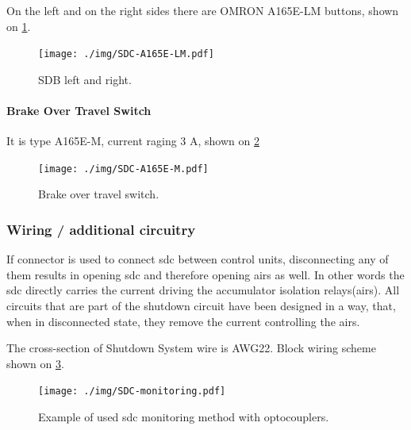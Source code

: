 On the left and on the right sides there are OMRON A165E-LM buttons, shown on \ref{fig:SDC-A165E-LM}.
\begin{figure}[H]
	\centering
	\texttt{[image: ./img/SDC-A165E-LM.pdf]}
	\caption{SDB left and right.}
	\label{fig:SDC-A165E-LM}
\end{figure}

\paragraph{Brake Over Travel Switch}
It is type A165E-M, current raging 3 A, shown on \ref{fig:SDC-A165E-M}
\begin{figure}[H]
	\centering
	\texttt{[image: ./img/SDC-A165E-M.pdf]}
	\caption{Brake over travel switch.}
	\label{fig:SDC-A165E-M}
\end{figure}


\subsubsection{Wiring / additional circuitry}

If connector is used to connect \gls{sdc} between control units, disconnecting any of them results in opening \gls{sdc} and therefore opening \glspl{air} as well. In other words the \gls{sdc} directly carries the current driving the accumulator isolation relays(\glspl{air}). All circuits that are part of the shutdown circuit have been designed in a way, that, when in disconnected state, they remove the current controlling the \glspl{air}.

The cross-section of Shutdown System wire is AWG22. Block wiring scheme shown on \ref{fig:SDC-schematic}.\\

\begin{figure}[H]
	\centering
	\texttt{[image: ./img/SDC-monitoring.pdf]}
	\caption{Example of used \gls{sdc} monitoring method with optocouplers.}
	\label{fig:SDC-schematic}
\end{figure}

